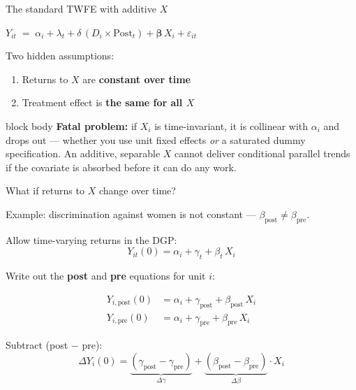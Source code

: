 \documentclass[aspectratio=169,11pt]{beamer}
\newcommand{\emphbox}[1]{%
  \begin{beamercolorbox}[rounded=true,sep=7pt,wd=\linewidth]{block body}%
    \small\color{slate} #1%
  \end{beamercolorbox}}
\begin{document}
\begin{frame}{The standard TWFE with additive $X$}
\vspace{0.6em}
\begin{center}
\large
$Y_{it} \;=\; \alpha_i + \lambda_t
      + \delta\,(D_i \times \mathrm{Post}_t)
      + \boldsymbol{\beta}\,X_i
      + \varepsilon_{it}$
\end{center}
\vspace{0.5em}
\begin{center}
Two hidden assumptions:
\begin{enumerate}
  \item Returns to $X$ are \textbf{constant over time}
  \item Treatment effect is \textbf{the same for all $X$}
\end{enumerate}
\end{center}
\vspace{0.4em}
\emphbox{\textbf{Fatal problem:} if $X_i$ is time-invariant, it is collinear with $\alpha_i$
and drops out --- whether you use unit fixed effects \emph{or} a saturated dummy
specification. An additive, separable $X$ cannot deliver conditional parallel
trends if the covariate is absorbed before it can do any work.}
\end{frame}

\begin{frame}{What if returns to $X$ change over time?}
\vspace{0.3em}
\begin{center}\color{warmgray}\small
Example: discrimination against women is not constant --- $\beta_{\text{post}} \neq \beta_{\text{pre}}$.
\end{center}
\vspace{0.4em}

Allow time-varying returns in the DGP:
\[
Y_{it}(0) = \alpha_i + \gamma_t + \beta_t\, X_i
\]

Write out the \textbf{post} and \textbf{pre} equations for unit $i$:

\begin{align*}
Y_{i,\text{post}}(0) &= \alpha_i + \gamma_{\text{post}} + \beta_{\text{post}}\, X_i \\[4pt]
Y_{i,\text{pre}}(0)  &= \alpha_i + \gamma_{\text{pre}}  + \beta_{\text{pre}}\,  X_i
\end{align*}

Subtract (post $-$ pre):
\[
\Delta Y_i(0)
  = \underbrace{(\gamma_{\text{post}} - \gamma_{\text{pre}})}_{\Delta\gamma}
  + \underbrace{(\beta_{\text{post}}  - \beta_{\text{pre}})}_{\Delta\beta}
    \cdot X_i
\]
\end{frame}
\end{document}
